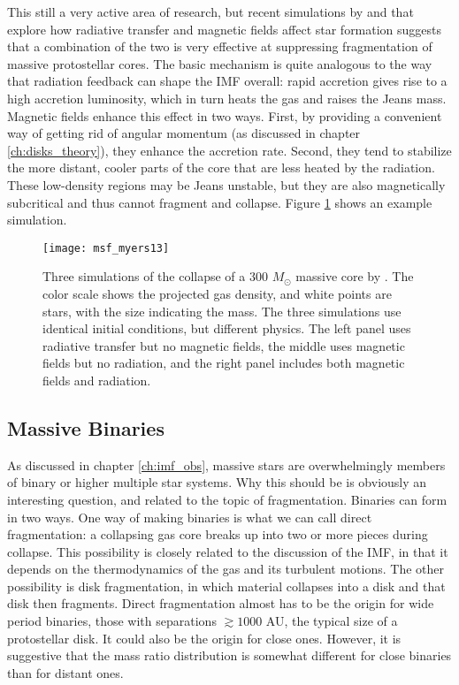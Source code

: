 This still a very active area of research, but recent simulations by \citet{commercon11c} and \citet{myers13a} that explore how radiative transfer and magnetic fields affect star formation suggests that a combination of the two is very effective at suppressing fragmentation of massive protostellar cores. The basic mechanism is quite analogous to the way that radiation feedback can shape the IMF overall: rapid accretion gives rise to a high accretion luminosity, which in turn heats the gas and raises the Jeans mass. Magnetic fields enhance this effect in two ways. First, by providing a convenient way of getting rid of angular momentum (as discussed in chapter \ref{ch:disks_theory}), they enhance the accretion rate. Second, they tend to stabilize the more distant, cooler parts of the core that are less heated by the radiation. These low-density regions may be Jeans unstable, but they are also magnetically subcritical and thus cannot fragment and collapse. Figure \ref{fig:msf_myers13} shows an example simulation.

\begin{figure}
\texttt{[image: msf\_myers13]}
\caption[Simulations of massive star formation with magnetic fields and radiation]{
\label{fig:msf_myers13}
Three simulations of the collapse of a 300 $M_\odot$ massive core by \citet{myers13a}. The color scale shows the projected gas density, and white points are stars, with the size indicating the mass. The three simulations use identical initial conditions, but different physics. The left panel uses radiative transfer but no magnetic fields, the middle uses magnetic fields but no radiation, and the right panel includes both magnetic fields and radiation.
}
\end{figure}

\subsection{Massive Binaries}

As discussed in chapter \ref{ch:imf_obs}, massive stars are overwhelmingly members of binary or higher multiple star systems. Why this should be is obviously an interesting question, and related to the topic of fragmentation. Binaries can form in two ways. One way of making binaries is what we can call direct fragmentation: a collapsing gas core breaks up into two or more pieces during collapse. This possibility is closely related to the discussion of the IMF, in that it depends on the thermodynamics of the gas and its turbulent motions. The other possibility is disk fragmentation, in which material collapses into a disk and that disk then fragments. Direct fragmentation almost has to be the origin for wide period binaries, those with separations $\gtrsim 1000$ AU, the typical size of a protostellar disk. It could also be the origin for close ones. However, it is suggestive that the mass ratio distribution is somewhat different for close binaries than for distant ones.

